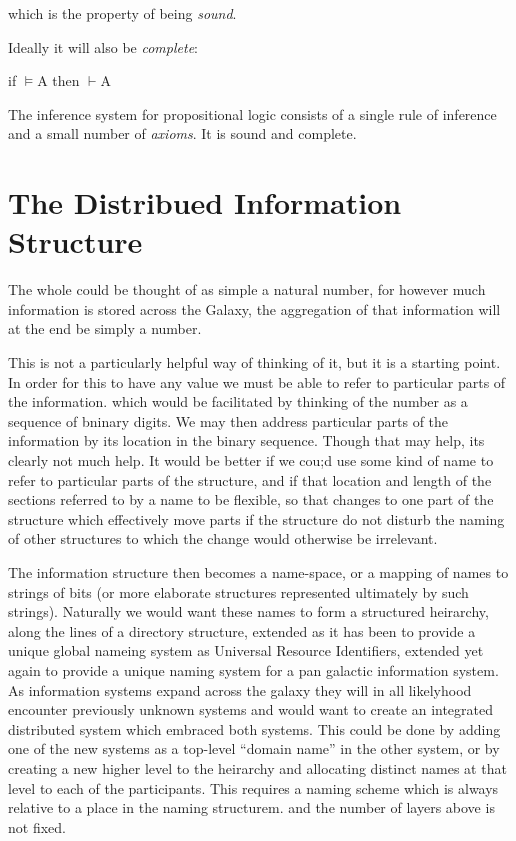 \documentclass[10pt,titlepage]{article}
\begin{document}
which is the property of being \emph{sound}.

Ideally it will also be \emph{complete}:

\begin{center}
  if $\vDash{}$A then $\vdash{}$A
\end{center}

The inference system for propositional logic consists of a single rule of inference and a small number of \emph{axioms}.
It is sound and complete.


\section{The Distribued Information Structure}

The whole could be thought of as simple a natural number, for however much information is stored across the Galaxy, the aggregation of that information will at the end be simply a number.

This is not a particularly helpful way of thinking of it, but it is a starting point.
In order for this to have any value we must be able to refer to particular parts of the information. which would be facilitated by thinking of the number as a sequence of bninary digits.
We may then address particular parts of the information by its location in the binary sequence.
Though that may help, its clearly not much help.
It would be better if we cou;d use some kind of name to refer to particular parts of the structure, and if that location and length of the sections referred to by a name to be flexible, so that changes to one part of the structure which effectively move parts if the structure do not disturb the naming of other structures to which the change would otherwise be irrelevant.

The information structure then becomes a name-space, or a mapping of names to strings of bits (or more elaborate structures represented ultimately by such strings).
Naturally we would want these names to form a structured heirarchy, along the lines of a directory structure, extended as it has been to provide a unique global nameing system as Universal Resource Identifiers, extended yet again to provide a unique naming system for a pan galactic information system.
As information systems expand across the galaxy they will in all likelyhood encounter previously unknown systems and would want to create an integrated distributed system which embraced both systems.
This could be done by adding one of the new systems as a top-level ``domain name'' in the other system, or by creating a new higher level to the heirarchy and allocating distinct names at that level to each of the participants.
This requires a naming scheme which is always relative to a place in the naming structurem. and the number of layers above is not fixed.
\end{document}
